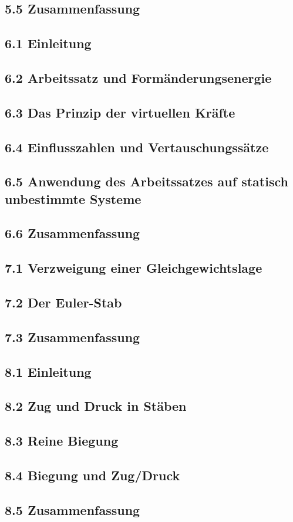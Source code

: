 \documentclass[11pt]{article}
\newcommand{\1}{ {\mathds{1}} }
\begin{document}
    \subsection*{5.5 Zusammenfassung}	

    \subsection*{6.1 Einleitung}
    \subsection*{6.2 Arbeitssatz und Formänderungsenergie}
    \subsection*{6.3 Das Prinzip der virtuellen Kräfte}
    \subsection*{6.4 Einflusszahlen und Vertauschungssätze}
    \subsection*{6.5 Anwendung des Arbeitssatzes auf statisch unbestimmte Systeme}
    \subsection*{6.6 Zusammenfassung}

    \subsection*{7.1 Verzweigung einer Gleichgewichtslage}
    \subsection*{7.2 Der Euler-Stab}
    \subsection*{7.3 Zusammenfassung}
	
    \subsection*{8.1 Einleitung}
    \subsection*{8.2 Zug und Druck in Stäben}
    \subsection*{8.3 Reine Biegung}
    \subsection*{8.4 Biegung und Zug/Druck}
    \subsection*{8.5 Zusammenfassung}
	
\end{document}
